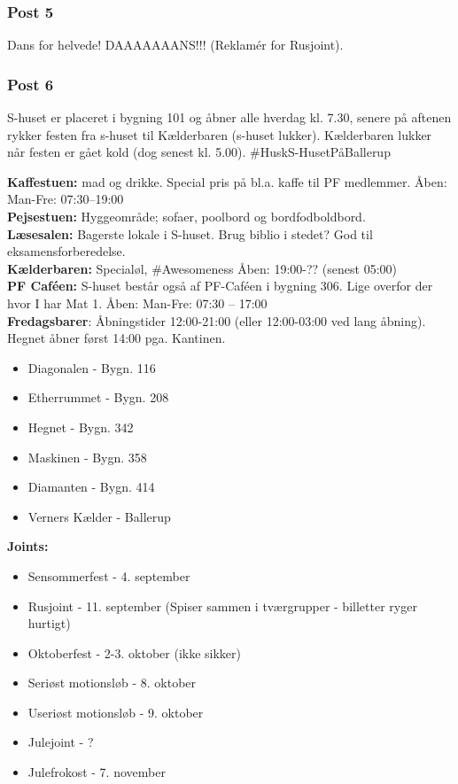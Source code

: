 \subsubsection{Post 5}
Dans for helvede! DAAAAAAANS!!! (Reklamér for Rusjoint).

\subsubsection{Post 6}
S-huset er placeret i bygning 101 og åbner alle hverdag kl. 7.30, senere på aftenen rykker festen fra s-huset til Kælderbaren (s-huset lukker). Kælderbaren lukker når festen er gået kold (dog senest kl. 5.00). \#HuskS-HusetPåBallerup

\textbf{Kaffestuen:} mad og drikke. Special pris på bl.a. kaffe til PF medlemmer. Åben: Man-Fre: 07:30–19:00\\
\textbf{Pejsestuen:} Hyggeområde; sofaer, poolbord og bordfodboldbord.\\
\textbf{Læsesalen:} Bagerste lokale i S-huset. Brug biblio i stedet? God til eksamensforberedelse.\\
\textbf{Kælderbaren:} Specialøl, \#Awesomeness Åben: 19:00-?? (senest 05:00)\\

\textbf{PF Caféen:} S-huset består også af PF-Caféen i bygning 306. Lige overfor der hvor I har Mat 1. Åben: Man-Fre: 07:30 – 17:00\\

\textbf{Fredagsbarer}: Åbningstider 12:00-21:00 (eller 12:00-03:00 ved lang åbning). Hegnet åbner først 14:00 pga. Kantinen.

\begin{multicols}{2}
\begin{itemize}
  \item Diagonalen - Bygn. 116
  \item Etherrummet - Bygn. 208
  \item Hegnet - Bygn. 342
  \item Maskinen - Bygn. 358
  \item Diamanten - Bygn. 414
  \item Verners Kælder - Ballerup
\end{itemize}
\end{multicols}

\textbf{Joints:}
\begin{multicols}{2}
\begin{itemize}
  \item Sensommerfest - 4. september
  \item Rusjoint - 11. september (Spiser sammen i tværgrupper - billetter ryger hurtigt)
  \item Oktoberfest - 2-3. oktober (ikke sikker)
  \item Seriøst motionsløb - 8. oktober
  \item Useriøst motionsløb - 9. oktober
  \item Julejoint - ?
  \item Julefrokost - 7. november %
\end{itemize}
\end{multicols}